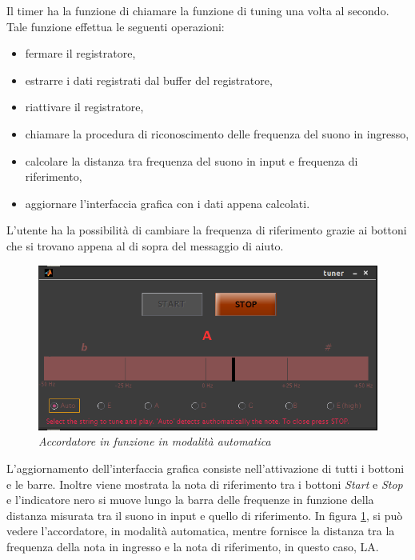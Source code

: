 Il timer ha la funzione di chiamare la funzione di tuning una volta al secondo. 
Tale funzione effettua le seguenti operazioni:
\begin{itemize}
	\item fermare il registratore,
	\item estrarre i dati registrati dal buffer del registratore,
	\item riattivare il registratore,
	\item chiamare la procedura di riconoscimento delle frequenza del suono in ingresso,
	\item calcolare la distanza tra frequenza del suono in input e frequenza di riferimento,
	\item aggiornare l'interfaccia grafica con i dati appena calcolati.
\end{itemize}

L'utente ha la possibilità di cambiare la frequenza di riferimento grazie ai bottoni che si trovano appena al di sopra del messaggio di aiuto.

	\begin{figure}[h]
	  \begin{center} 
	    \includegraphics[width=\textwidth*\real{0.8}]{images/ch_07/accordatore_auto.png}
	  \end{center} 
	  \caption{\textit{Accordatore in funzione in modalità automatica}}  
	  \label{fig:accordatore_in_funzione}
	\end{figure}

L'aggiornamento dell'interfaccia grafica consiste nell'attivazione di tutti i bottoni e le barre. 
Inoltre viene mostrata la nota di riferimento tra i bottoni \emph{Start} e \emph{Stop} e l'indicatore nero si muove lungo la barra delle frequenze in funzione della distanza misurata tra il suono in input e quello di riferimento. 
In figura \ref{fig:accordatore_in_funzione}, si può vedere l'accordatore, in modalità automatica, mentre fornisce la distanza tra la frequenza della nota in ingresso e la nota di riferimento, in questo caso, LA.



